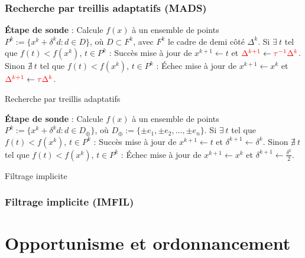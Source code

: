 \documentclass{beamer}
\newcommand\tab[1][1cm]{\hspace*{#1}}
\newcommand{\MADS}{\textsf{MADS}}
\newcommand{\IMFIL}{\textsf{IMFIL}}
\begin{document}
\begin{frame}
\frametitle{Recherche par treillis adaptatifs (\MADS)}
\begin{algorithm}[H]
\begin{algorithmic}[]
\STATE \textbf{Étape de sonde} : Calcule $f(x)$ à un ensemble de points 
\STATE $P^k:=\{x^k+\delta ^k d:d\in D\}$, où {\color{red}$D\subset F^k$,
\STATE avec $F^k$ le cadre de demi côté $\Delta^k$.}
\STATE
\STATE Si $\exists~t$ tel que $f(t) < f(x^k)$, $t\in P^k$ : Succès
\STATE \tab mise à jour de $x^{k+1}\leftarrow t$ et ${\color{red}\Delta^{k+1}} \leftarrow {\color{red}\tau^{-1}\Delta^k}$.
\STATE
\STATE Sinon $\nexists~t$ tel que $f(t) < f(x^k)$, $t\in P^k$ : Échec
\STATE \tab mise à jour de $x^{k+1}\leftarrow x^k$ et ${\color{red}\Delta^{k+1}} \leftarrow {\color{red}\tau\Delta^k}$.
\ENDFOR
\end{algorithmic}
\caption{Recherche par treillis adaptatifs}
\label{alg:mads}
\end{algorithm}
\end{frame}

\begin{frame}
\begin{algorithm}[H]
\begin{algorithmic}[]
\STATE \textbf{Étape de sonde} : Calcule $f(x)$ à un ensemble de points
\STATE $P^k:=\{x^k+\delta ^k d:d\in D_{\oplus}\}$, où $D_{\oplus} := \{\pm e_1,\pm e_2,\dots,\pm e_n\}$.
\STATE
\STATE Si $\exists~t$ tel que $f(t) < f(x^k)$, $t\in P^k$ : Succès
\STATE \tab mise à jour de $x^{k+1}\leftarrow t$ et $\delta^{k+1} \leftarrow \delta^k$.
\STATE
\STATE Sinon $\nexists~t$ tel que $f(t) < f(x^k)$, $t\in P^k$ : Échec
\STATE \tab mise à jour de $x^{k+1}\leftarrow x^k$ et $\delta^{k+1} \leftarrow \frac{\delta^k}{2}$.
\ENDFOR
\end{algorithmic}
\caption{Filtrage implicite}
\label{alg:cs}
\end{algorithm}
\frametitle{Filtrage implicite (\IMFIL)}
\end{frame}

\section{Opportunisme et ordonnancement}
\tableofcontents[currentsection,currentsubsection,subsectionstyle=show/hide]
\end{document}
